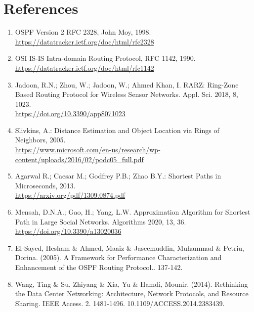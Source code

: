\section*{References}

\begin{enumerate}
\item \label{ref:ospf} OSPF Version 2 RFC 2328, John Moy, 1998.\\
\url{https://datatracker.ietf.org/doc/html/rfc2328}

\item \label{ref:isis} OSI IS-IS Intra-domain Routing Protocol, RFC 1142, 1990.\\ \url{https://datatracker.ietf.org/doc/html/rfc1142} 

\item \label{ref:ring-zone} Jadoon, R.N.; Zhou, W.; Jadoon, W.; Ahmed Khan, I. RARZ: Ring-Zone Based Routing Protocol for Wireless Sensor Networks. Appl. Sci. 2018, 8, 1023.\\ \url{https://doi.org/10.3390/app8071023}

\item \label{ref:rings} Slivkins, A.: Distance Estimation and Object Location via Rings of Neighbors, 2005.\\ \url{https://www.microsoft.com/en-us/research/wp-content/uploads/2016/02/podc05_full.pdf}

\item \label{ref:sp-us} Agarwal R.; Caesar M.; Godfrey P.B.; Zhao B.Y.: Shortest Paths in Microseconds, 2013.\\ \url{https://arxiv.org/pdf/1309.0874.pdf}

\item \label{ref:social} Mensah, D.N.A.; Gao, H.; Yang, L.W. Approximation Algorithm for Shortest Path in Large Social Networks. Algorithms 2020, 13, 36.\\ \url{https://doi.org/10.3390/a13020036}

\item \label{ref:ispf} El-Sayed, Hesham \& Ahmed, Maaiz \& Jaseemuddin, Muhammad \& Petriu, Dorina. (2005). A Framework for Performance Characterization and Enhancement of the OSPF Routing Protocol.. 137-142.

\item \label{ref:fat} Wang, Ting \& Su, Zhiyang \& Xia, Yu \& Hamdi, Mounir. (2014). Rethinking the Data Center Networking: Architecture, Network Protocols, and Resource Sharing. IEEE Access. 2. 1481-1496. 10.1109/ACCESS.2014.2383439.

\end{enumerate}
